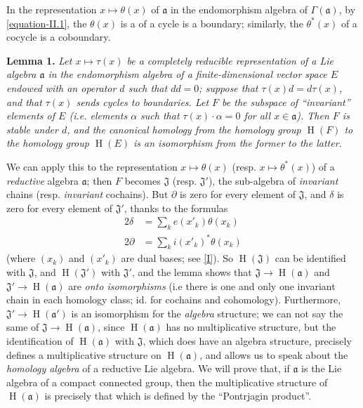 \documentclass{article}
\newcommand{\fk}{\mathfrak}
\DeclareMathOperator{\HH}{H}
\newcommand{\oldpage}[1]{\marginpar{\footnotesize$\Big\vert$ \textit{p.~#1}}}
\begin{document}
In the representation $x\mapsto\theta(x)$ of $\fk{a}$ in the endomorphism algebra of $\Gamma(\fk{a})$, by \cref{equation-II.1}, the $\theta(x)$ is a of a cycle is a boundary;
similarly, the $\theta^*(x)$ of a cocycle is a coboundary.

\medskip
\textbf{Lemma 1.}
{\itshape
  Let $x\mapsto\tau(x)$ be a completely reducible representation of a Lie algebra $\fk{a}$ in the endomorphism algebra of a finite-dimensional vector space $E$ endowed with an operator $d$ such that $dd=0$;
  suppose that $\tau(x)d=d\tau(x)$, and that $\tau(x)$ sends cycles to boundaries.
  Let $F$ be the subspace of ``invariant'' elements of $E$ (i.e. elements $\alpha$ such that $\tau(x)\cdot\alpha=0$ for all $x\in\fk{a}$).
  Then $F$ is stable under $d$, and the canonical homology from the homology group $\HH(F)$ to the homology group $\HH(E)$ is an \emph{isomorphism} from the former to the latter.
}

We can apply this to the representation $x\mapsto\theta(x)$ (resp. $x\mapsto\theta^*(x)$) of a \emph{reductive} algebra $\fk{a}$;
then $F$ becomes $\fk{J}$ (resp. $\fk{J}'$), the sub-algebra of \emph{invariant} chains (resp. \emph{invariant} cochains).
But $\partial$ is zero for every element of $\fk{J}$, and $\delta$ is zero for every element of $\fk{J}'$, thanks to the formulas
\[
  \begin{aligned}
    2\delta
    &= \sum_k e(x'_k)\theta(x_k)
  \\2\partial
    &= \sum_k i(x'_k)^*\theta(x_k)
  \end{aligned}
\]
(where $(x_k)$ and $(x'_k)$ are dual bases; see \cref{I}).
So $\HH(\fk{J})$ can be identified with $\fk{J}$,
and
\oldpage{48}
$\HH(\fk{J}')$ with $\fk{J}'$, and the lemma shows that $\fk{J}\to\HH(\fk{a})$ and $\fk{J}'\to\HH(\fk{a})$ are \emph{onto isomorphisms} (i.e there is one and only one invariant chain in each homology class; id. for cochains and cohomology).
Furthermore, $\fk{J}'\to\HH(\fk{a}')$ is an isomorphism for the \emph{algebra} structure;
we can not say the same of $\fk{J}\to\HH(\fk{a})$, since $\HH(\fk{a})$ has no multiplicative structure, but the identification of $\HH(\fk{a})$ with $\fk{J}$, which does have an algebra structure, precisely defines a multiplicative structure on $\HH(\fk{a})$, and allows us to speak about the \emph{homology algebra} of a reductive Lie algebra.
We will prove that, if $\fk{a}$ is the Lie algebra of a compact connected group, then the multiplicative structure of $\HH(\fk{a})$ is precisely that which is defined by the ``Pontrjagin product''.
\end{document}
